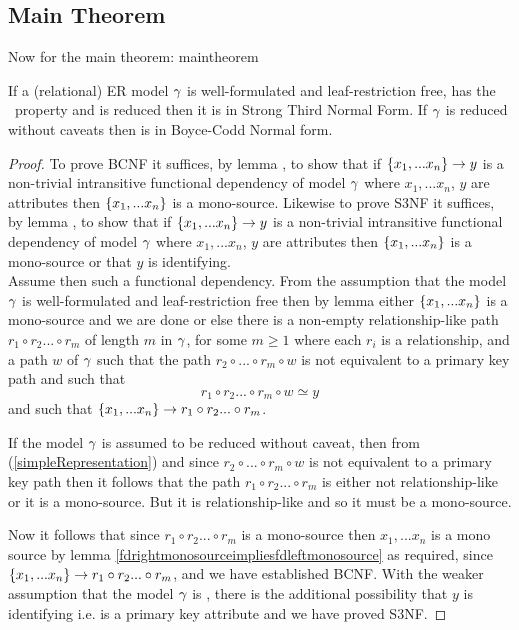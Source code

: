 \subsection{Main Theorem}
\noindent Now for the main theorem:
maintheorem
\begin{theorem}
\noindent If a (relational) ER model $\gamma$ is well-formulated and leaf-restriction free, has the \fdfactoring\ property and is reduced then it is in Strong Third Normal Form. 
If  $\gamma$ is reduced without caveats then is in Boyce-Codd Normal form.
\end{theorem}
\begin{proof}
To prove BCNF it suffices, by lemma ,  to show that if 
$\left\{x_1,...x_n\right\} \rightarrow y$ is a non-trivial intransitive functional dependency of model $\gamma$
where $x_1,...x_n$, $y$ are attributes 
then  $\left\{x_1,...x_n\right\}$ is a mono-source.
Likewise to prove S3NF it suffices, by lemma ,  to show that if 
$\left\{x_1,...x_n\right\} \rightarrow y$ is a non-trivial intransitive functional dependency of model $\gamma$
where $x_1,...x_n$, $y$ are attributes 
then  $\left\{x_1,...x_n\right\}$ is a mono-source or that $y$ is identifying. \\
Assume then such a functional dependency.
From the assumption that the model $\gamma$ is well-formulated and leaf-restriction free
then by lemma   
either $\left\{x_1,...x_n\right\}$ is a mono-source and we are done
or else there is a non-empty relationship-like path $r_1 \circ r_2 ... \circ r_m$ 
of length $m$ in $\gamma$, for some $m \geq 1$  where each $r_i$ is a relationship,
and a path $w$ of $\gamma$ 
such that the path $r_2 \circ ... \circ r_m \circ w$
 is not  equivalent to a primary key path and such that 
\begin{equation}
\label{simpleRepresentation}
 r_1 \circ r_2 ... \circ r_m \circ w \simeq y
\end{equation}
and such that $\left\{x_1,...x_n\right\} \rightarrow r_1 \circ r_2 ... \circ r_m$. 

If the model $\gamma$ is assumed to be reduced without caveat,  then from (\ref{simpleRepresentation})
and since $r_2 \circ ... \circ r_m \circ w$
 is not  equivalent to a primary key path then it follows that the path $r_1 \circ r_2 ... \circ r_m$ is either not relationship-like or it is a mono-source.
But it is relationship-like and so it must be a mono-source. 

Now it follows that since $r_1 \circ r_2 ... \circ r_m$ is a mono-source then $x_1,...x_n$ is a mono source by lemma \ref{fdrightmonosourceimpliesfdleftmonosource} as required, 
since $\left\{x_1,...x_n\right\} \rightarrow r_1\circ r_2 ... \circ r_m$, and we have established BCNF.
With the weaker assumption that the model $\gamma$ is , there is the additional possibility that $y$ is identifying i.e. is a primary key attribute and we have proved S3NF.
\end{proof}

